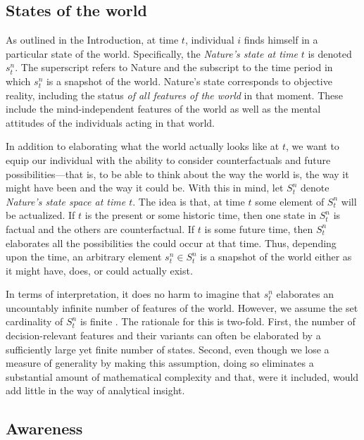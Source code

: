 \documentclass[
11pt,
titlepage,
reqno,
]{article}%
\theoremstyle{definition}
\begin{document}
\subsection{States of the world\label{sec:states}}
As outlined in the Introduction, at time $t$, individual $i$ finds himself in a particular state of the world.
Specifically, the \textit{Nature's state at time} $t$ is denoted $s^n_t$.
The superscript refers to Nature and the subscript to the time period in which $s^n_t$ is a snapshot of the world.
Nature's state corresponds to objective reality, including the status \textit{of all features of the world} in that moment. 
These include the  mind-independent features of the world as well as the mental attitudes of the individuals acting in that world. 

In addition to elaborating what the world actually looks like at $t$, we want to equip our individual with the ability to consider counterfactuals and future possibilities---that is, to be able to think about the way the world is, the way it might have been and the way it could be.
With this in mind, let $S^n_t$ denote \textit{Nature's state space at time $t$}. 
The idea is that, at time $t$ some element of $S^n_t$ will be actualized. 
If $t$ is the present or some historic time, then one state in  $S^n_t$ is factual and the others are counterfactual. 
If $t$ is some future time, then $S^n_t$ elaborates all the possibilities the could occur at that time.
Thus, depending upon the time, an arbitrary element $s_t^n\in S^n_t$ is a snapshot of the world either as it might have, does, or could actually exist.


In terms of interpretation, it does no harm to imagine that $s^n_t$ elaborates an uncountably infinite number of features of the world.
However,  we assume the set cardinality of $S^n_t$ is finite .
The rationale for this is two-fold.
First, the number of decision-relevant features and their variants can often be elaborated by a sufficiently large yet finite number of states.
Second, even  though we lose a measure of generality by making this assumption, doing so eliminates a substantial amount of mathematical complexity and that, were it included, would add little in the way of analytical insight.

\subsection{Awareness}
\end{document}
